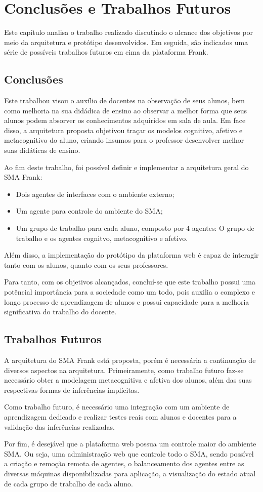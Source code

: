 \chapter{Conclusões e Trabalhos Futuros}
Este capítulo analisa o trabalho realizado discutindo o alcance dos objetivos por meio da arquitetura e protótipo desenvolvidos. Em seguida, são indicados uma série de possíveis trabalhos futuros em cima da plataforma Frank.

\section{Conclusões}
Este trabalhou visou o auxílio de docentes na observação de seus alunos, bem como melhoria na sua didádica de ensino ao observar a melhor forma que seus alunos podem absorver os conhecimentos adquiridos em sala de aula. Em face disso, a arquitetura proposta objetivou traçar os modelos cognitivo,  afetivo e metacognitivo do aluno, criando insumos para o professor desenvolver melhor suas didáticas de ensino.

Ao fim deste trabalho, foi possível definir e implementar a arquitetura geral do SMA Frank:
\begin{itemize}
 	\item Dois agentes de interfaces com o ambiente externo;
	\item Um agente para controle do ambiente do SMA;
	\item Um grupo de trabalho para cada aluno, composto por 4 agentes: O grupo de trabalho e os agentes cognitvo, metacognitivo e afetivo.
\end{itemize}

Além disso, a implementação do protótipo da plataforma web é capaz de interagir tanto com os alunos, quanto com os seus professores.

Para tanto, com os objetivos alcançados, concluí-se que este trabalho possui uma potêncial importância para a sociedade como um todo, pois auxilia o complexo e longo processo de aprendizagem de alunos e possui capacidade para a melhoria significativa do trabalho do docente.

\section{Trabalhos Futuros}
A arquitetura do SMA Frank está proposta, porém é necessária a continuação de diversos aspectos na arquitetura. Primeiramente, como trabalho futuro faz-se necessário obter a modelagem metacognitiva e afetiva dos alunos, além das suas respectivas formas de inferências implícitas.

Como trabalho futuro, é necessário uma integração com um ambiente de aprendizagem dedicado e realizar testes reais com alunos e docentes para a validação das inferências realizadas.

Por fim, é desejável que a plataforma web possua um controle maior do ambiente SMA. Ou seja, uma administração web que controle todo o SMA, sendo possível a criação e remoção remota de agentes, o balanceamento dos agentes entre as diversas máquinas disponibilizadas para aplicação, a visualização do estado atual de cada grupo de trabalho de cada aluno.
